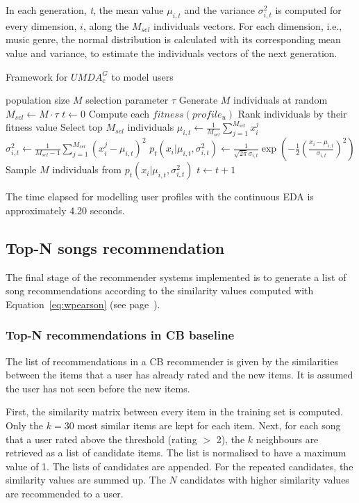 In each generation, \emph{t}, the mean value $\mu_{i,t}$ and the variance $\sigma_{i,t}^2$ is computed for every dimension, $i$, along the $M_{sel}$ individuals vectors. For each dimension, i.e., music genre, the normal distribution is calculated with its corresponding mean value and variance, to estimate the  individuals vectors of the next generation.
\begin{algorithm}[ht!]
	\caption{Framework for $UMDA_c^G$ to model users}
	\begin{algorithmic} 
		\REQUIRE population size $M$
		\REQUIRE selection parameter $\tau$
		\STATE Generate $M$ individuals at random
		\STATE $M_{sel}\leftarrow M\cdot\tau$
		\STATE $t \leftarrow 0$
		\STATE Compute each $fitness(profile_u)$
		\STATE Rank individuals by their fitness value
		\STATE Select top $M_{sel}$ individuals 
		\STATE $\mu_{i,t}\leftarrow\frac{1}{M_{sel}}\sum_{j=1}^{M_{sel}}x_i^j$
		\STATE $\sigma_{i,t}^2\leftarrow\frac{1}{M_{sel}-1}\sum_{j=1}^{M_{sel}}(x_i^j-\mu_{i,t})^2$ 
		\STATE $p_t({x_{i}}\vert \mu_{i,t},\sigma_{i,t}^2)\leftarrow\frac{1}{\sqrt{2\pi}\sigma_{i,t}}\exp(-\frac{1}{2}(\frac{x_i-\mu_{i,t}}{\sigma_{i,t}})^2)$
		\STATE Sample $M$ individuals from $p_t({x_{i}}\vert \mu_{i,t},\sigma_{i,t}^2)$
		\STATE $t\leftarrow t+1$
		\ENDWHILE
	\end{algorithmic}
	\label{alg:umda2}
\end{algorithm}
The time elapsed for modelling user profiles with the continuous EDA is approximately 4.20 seconds.
\subsection{Top-N songs recommendation}
The final stage of the recommender systems implemented is to generate a list of song recommendations according to the similarity values computed with Equation~\eqref{eq:wpearson} (see page~\pageref{eq:wpearson}).
\subsubsection{Top-N recommendations in CB baseline}
The list of recommendations in a CB recommender is given by the similarities between the items that a user has already rated and the new items. It is assumed the user has not seen before the new items.

First, the similarity matrix between every item in the training set is computed. Only the $k=30$ most similar items are kept for each item. Next, for each song that a user rated above the threshold (rating $>$ 2), the $k$ neighbours are retrieved as a list of candidate items. The list is normalised to have a maximum value of 1. The lists of candidates are appended. For the repeated candidates, the similarity values are summed up. The $N$ candidates with higher similarity values are recommended to a user.

